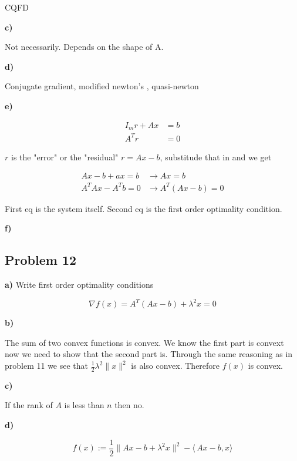 CQFD

\textbf{c)}

\answer

Not necessarily. Depends on the shape of A.

\textbf{d)}

\answer

Conjugate gradient, modified newton's , quasi-newton

\textbf{e)}

\answer

\begin{align*}
	I_m r + Ax &= b \\
	A^T r &= 0
\end{align*}

$r$ is the "error" or the "residual" $r = Ax - b$, substitude that in and we get

\begin{align*}
	Ax -b + ax = b &\rightarrow Ax = b \\
	A^TAx - A^T b = 0 &\rightarrow A^T(Ax-b) = 0
\end{align*}

First eq is the system itself. Second eq is the first order optimality condition.

\textbf{f)}

\incomplete

\subsection{Problem 12}

\textbf{a)} Write first order optimality conditions

\answer

\[
	\nabla f(x) = A^T(Ax-b) + \lambda^2 x = 0
\]

\textbf{b)}

\answer

The sum of two convex functions is convex. We know the first part is convext now we need to show that the second part is. Through the same reasoning as in problem 11 we see that $\frac{1}{2} \lambda^2 \| x \| ^2$ is also convex. Therefore $f(x)$ is convex.

\textbf{c)}

\answer

If the rank of $A$ is less than $n$ then no.

\textbf{d)}

\answer

\[
	f(x) := \frac{1}{2} \| Ax - b + \lambda^2 x\|^2 - \langle\, Ax-b,x\rangle
\]


